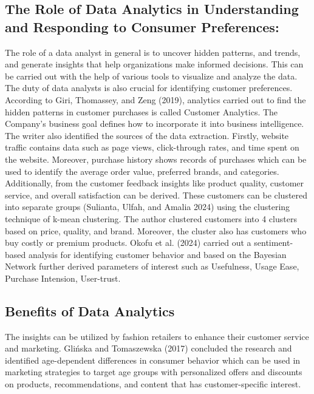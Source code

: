 \documentclass[
  letterpaper,
  DIV=11,
  numbers=noendperiod]{scrartcl}
\begin{document}
\subsection{The Role of Data Analytics in Understanding and Responding
to Consumer
Preferences:}\label{the-role-of-data-analytics-in-understanding-and-responding-to-consumer-preferences}

The role of a data analyst in general is to uncover hidden patterns, and
trends, and generate insights that help organizations make informed
decisions. This can be carried out with the help of various tools to
visualize and analyze the data. The duty of data analysts is also
crucial for identifying customer preferences. According to Giri,
Thomassey, and Zeng (2019), analytics carried out to find the hidden
patterns in customer purchases is called Customer Analytics. The
Company's business goal defines how to incorporate it into business
intelligence. The writer also identified the sources of the data
extraction. Firstly, website traffic contains data such as page views,
click-through rates, and time spent on the website. Moreover, purchase
history shows records of purchases which can be used to identify the
average order value, preferred brands, and categories. Additionally,
from the customer feedback insights like product quality, customer
service, and overall satisfaction can be derived. These customers can be
clustered into separate groups (Sulianta, Ulfah, and Amalia 2024) using
the clustering technique of k-mean clustering. The author clustered
customers into 4 clusters based on price, quality, and brand. Moreover,
the cluster also has customers who buy costly or premium products. Okofu
et al. (2024) carried out a sentiment-based analysis for identifying
customer behavior and based on the Bayesian Network further derived
parameters of interest such as Usefulness, Usage Ease, Purchase
Intension, User-trust.

\subsection{Benefits of Data
Analytics}\label{benefits-of-data-analytics}

The insights can be utilized by fashion retailers to enhance their
customer service and marketing. Glińska and Tomaszewska (2017) concluded
the research and identified age-dependent differences in consumer
behavior which can be used in marketing strategies to target age groups
with personalized offers and discounts on products, recommendations, and
content that has customer-specific interest.
\end{document}

